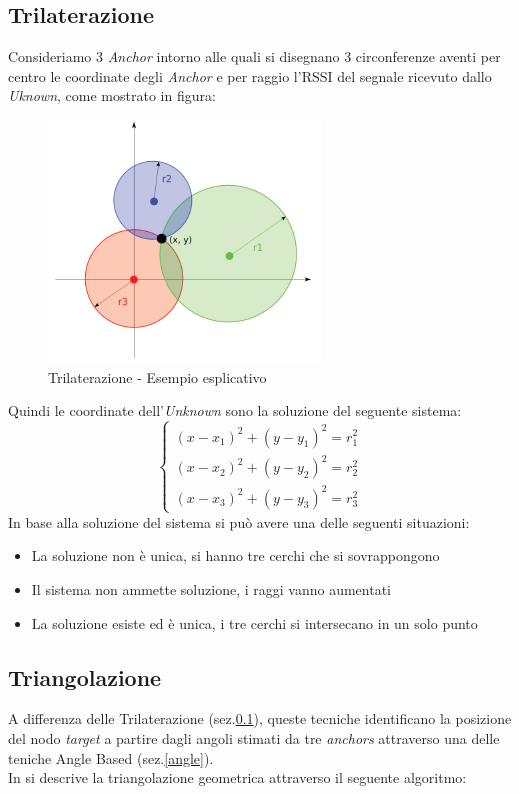 \subsection{Trilaterazione}
\label{trilaterazione}
Consideriamo 3 \textit{Anchor} intorno alle quali si disegnano 3 circonferenze aventi per centro le coordinate degli \textit{Anchor} e per raggio l'RSSI del segnale ricevuto dallo \textit{Uknown}, come mostrato in figura:
\begin{figure}[H]  
	\centering 
	\includegraphics[scale=0.8]{ContestoApplicativo/trilaterazione.png}
	\caption{Trilaterazione - Esempio esplicativo}
	\label{fig:trilaterazione}
\end{figure}
Quindi le coordinate dell'\textit{Unknown} sono la soluzione del seguente sistema:
\begin{equation}
\begin{cases}
(x-x_1)^2 + (y-y_1)^2 = r_1^2\\
(x-x_2)^2 + (y-y_2)^2 = r_2^2\\
(x-x_3)^2 + (y-y_3)^2 = r_3^2
\end{cases}
\end{equation}
In base alla soluzione del sistema si può avere una delle seguenti situazioni:
\begin{itemize}
	\item La soluzione non è unica, si hanno tre cerchi che si sovrappongono
	\item Il sistema non ammette soluzione, i raggi vanno aumentati
	\item La soluzione esiste ed è unica, i tre cerchi si intersecano in un solo punto
\end{itemize}



\subsection{Triangolazione}
\label{triangolazione}
A differenza delle Trilaterazione (sez.\ref{trilaterazione}), queste tecniche identificano la posizione del nodo \textit{target} a partire dagli angoli stimati da tre \textit{anchors} attraverso una delle teniche Angle Based (sez.\ref{angle}).\\
In \cite{triangolazione} si descrive la triangolazione geometrica attraverso il seguente algoritmo:\\

